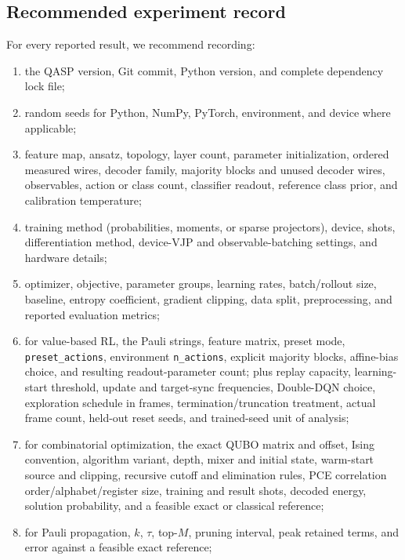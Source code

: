 \documentclass[10pt]{article}
\newcommand{\code}[1]{\texttt{#1}}
\begin{document}
\subsection{Recommended experiment record}

For every reported result, we recommend recording:

\begin{enumerate}
  \item the QASP version, Git commit, Python version, and complete dependency lock file;
  \item random seeds for Python, NumPy, PyTorch, environment, and device where applicable;
  \item feature map, ansatz, topology, layer count, parameter initialization,
        ordered measured wires, decoder family, majority blocks and unused
        decoder wires, observables, action or class count, classifier readout,
        reference class prior, and calibration temperature;
  \item training method (probabilities, moments, or sparse projectors), device,
        shots, differentiation method, device-VJP and observable-batching
        settings, and hardware details;
  \item optimizer, objective, parameter groups, learning rates,
        batch/rollout size, baseline, entropy coefficient, gradient clipping,
        data split, preprocessing, and reported evaluation metrics;
  \item for value-based RL, the Pauli strings, feature matrix, preset mode,
        \code{preset\_actions}, environment \code{n\_actions}, explicit
        majority blocks, affine-bias choice, and resulting readout-parameter
        count; plus replay capacity, learning-start threshold,
        update and target-sync frequencies, Double-DQN choice, exploration
        schedule in frames, termination/truncation treatment, actual frame
        count, held-out reset seeds, and trained-seed unit of analysis;
  \item for combinatorial optimization, the exact QUBO matrix and offset,
        Ising convention, algorithm variant, depth, mixer and initial state,
        warm-start source and clipping, recursive cutoff and elimination
        rules, PCE correlation order/alphabet/register size, training and
        result shots, decoded energy, solution probability, and a feasible
        exact or classical reference;
  \item for Pauli propagation, $k$, $\tau$, top-$M$, pruning interval, peak retained terms, and error against a feasible exact reference;

\end{enumerate}
\end{document}
